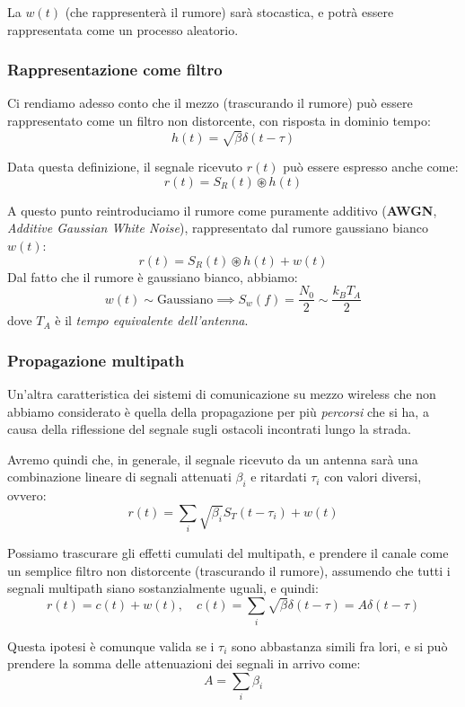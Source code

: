 \documentclass[a4paper,11pt]{article}
\begin{document}
La $w(t)$ (che rappresenterà il rumore) sarà stocastica, e potrà essere rappresentata come un processo aleatorio.

\subsubsection{Rappresentazione come filtro}
Ci rendiamo adesso conto che il mezzo (trascurando il rumore) può essere rappresentato come un filtro non distorcente, con risposta in dominio tempo:
$$
h(t) = \sqrt{\beta} \delta(t - \tau)
$$

Data questa definizione, il segnale ricevuto $r(t)$ può essere espresso anche come:
$$
r(t) = S_R(t) \circledast h(t)
$$

A questo punto reintroduciamo il rumore come puramente additivo (\textbf{AWGN}, \textit{Additive Gaussian White Noise}), rappresentato dal rumore gaussiano bianco $w(t)$:
$$
r(t) = S_R(t) \circledast h(t) + w(t)
$$
Dal fatto che il rumore è gaussiano bianco, abbiamo:
$$
w(t) \sim \text{Gaussiano} \implies S_w(f) = \frac{N_0}{2} \sim \frac{k_B T_A}{2}
$$
dove $T_A$ è il \textit{tempo equivalente dell'antenna}.

\subsubsection{Propagazione multipath}
Un'altra caratteristica dei sistemi di comunicazione su mezzo wireless che non abbiamo considerato è quella della propagazione per più \textit{percorsi} che si ha, a causa della riflessione del segnale sugli ostacoli incontrati lungo la strada.

Avremo quindi che, in generale, il segnale ricevuto da un antenna sarà una combinazione lineare di segnali attenuati $\beta_i$ e ritardati $\tau_i$ con valori diversi, ovvero:
$$
r(t) = \sum_i \sqrt{\beta_i} S_T(t - \tau_i) + w(t)
$$

\par\smallskip

Possiamo trascurare gli effetti cumulati del multipath, e prendere il canale come un semplice filtro non distorcente (trascurando il rumore), assumendo che tutti i segnali multipath siano sostanzialmente uguali, e quindi:
$$
r(t) = c(t) + w(t), \quad c(t) = \sum_i \sqrt{\beta} \delta(t - \tau) = A \delta(t - \tau)
$$

Questa ipotesi è comunque valida se i $\tau_i$ sono abbastanza simili fra lori, e si può prendere la somma delle attenuazioni dei segnali in arrivo come:
$$
A = \sum_i \beta_i
$$
\end{document}

